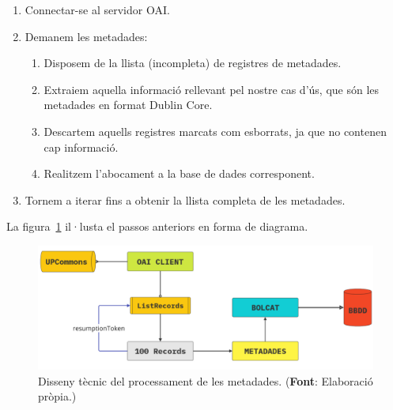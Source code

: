 \begin{enumerate}
    \item Connectar-se al servidor \gls{OAI}.
    \item Demanem les metadades:
    \begin{enumerate}
        \item Disposem de la llista (incompleta) de registres de metadades.
        \item Extraiem aquella informació rellevant pel nostre cas d'ús, que són les metadades en format \gls{Dublin Core}.
        \item Descartem aquells registres marcats com esborrats, ja que no contenen cap informació.
        \item Realitzem l'abocament a la base de dades corresponent.
    \end{enumerate}
    \item Tornem a iterar fins a obtenir la llista completa de les metadades.
\end{enumerate}

\noindent
La figura~\ref{fig:metadata-processing-workflow} il·lusta el passos anteriors en forma de diagrama.

\begin{figure}[htbp]
    \centerline{\includegraphics[width=1\textwidth]{figures/metadata-processing}}
    \captionsetup{justification=centering}
    \caption[Disseny tècnic del processament de les metadades.]{Disseny tècnic del processament de les metadades. (\textbf{Font}: Elaboració pròpia.)}\label{fig:metadata-processing-workflow}
\end{figure}
